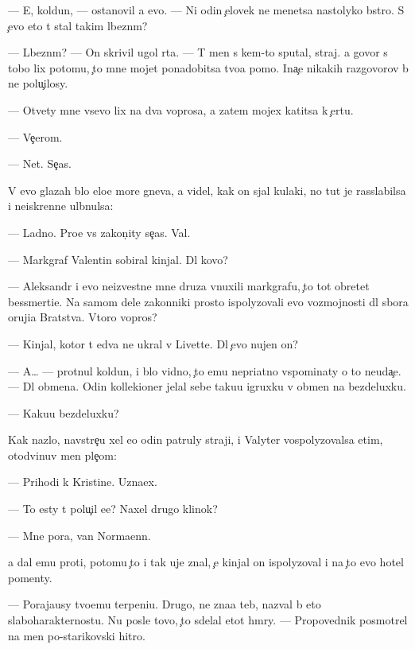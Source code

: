 \documentclass[10pt]{book}
\begin{document}
— E{\y}, koldun, — ostanovil {\y}a {\y}evo. — Ni odin {\c}elovek ne men{\ia}{\y}etsa nastolyko b{\yi}stro. S {\c}evo eto t{\yi} stal takim l{\iu}bezn{\yi}m?

— L{\iu}bezn{\yi}m? — On skrivil ugol rta. — T{\yi} men{\ia} s kem-to sputal, straj. {\Y}a govor{\iu} s tobo{\y} lix potomu, {\c}to mne mojet ponadobitsa tvo{\y}a pomo{\x}. Ina{\c}e nikakih razgovorov b{\yi} ne polu{\c}ilosy.

— Otvety mne vsevo lix na dva voprosa, a zatem mojex katitsa k {\c}ertu.

— Ve{\c}erom.

— Net. Se{\y}{\c}as.

V {\y}evo glazah b{\yi}lo {\q}elo{\y}e more gneva, {\y}a videl, kak on sjal kulaki, no tut je rasslabilsa i ne{\y}iskrenne ul{\yi}bnulsa:

— Ladno. Pro{\x}e vs{\e} zakon{\c}ity se{\y}{\c}as. Val{\ia}{\y}.

— Markgraf Valentin sobiral kinjal{\yi}. Dl{\ia} kovo?

— Aleksandr i {\y}evo ne{\y}izvestn{\yi}{\y}e mne druz{\y}a vnuxili markgrafu, {\c}to tot obretet bessmerti{\y}e. Na samom dele zakonniki prosto ispolyzovali {\y}evo vozmojnosti dl{\ia} sbora oruji{\y}a Bratstva. Vtoro{\y} vopros?

— Kinjal, kotor{\yi}{\y} t{\yi} {\y}edva ne ukral v Livette. Dl{\ia} {\c}evo nujen on?

— A… — prot{\ia}nul koldun, i b{\yi}lo vidno, {\c}to {\y}emu nepri{\y}atno vspominaty o to{\y} neuda{\c}e. — Dl{\ia} obmena. Odin kollek{\q}ioner jelal sebe taku{\y}u igruxku v obmen na bezdeluxku.

— Kaku{\y}u bezdeluxku?

Kak nazlo, navstre{\c}u xel {\y}e{\x}o odin patruly straji, i Valyter vospolyzovalsa etim, otodvinuv men{\ia} ple{\c}om:

— Prihodi k Kristine. Uzna{\y}ex.

— To {\y}esty t{\yi} polu{\c}il {\y}e{\y}e? Naxel drugo{\y} klinok?

— Mne pora, van Norma{\y}enn.

{\Y}a dal {\y}emu pro{\y}ti, potomu {\c}to i tak uje znal, {\c}e{\y} kinjal on ispolyzoval i na {\c}to {\y}evo hotel pomen{\ia}ty.



— Poraja{\y}usy tvo{\y}emu terpeni{\y}u. Drugo{\y}, ne zna{\y}a teb{\ia}, nazval b{\yi} eto slaboharakternost{\y}u. Nu posle tovo, {\c}to sdelal etot hm{\yi}ry. — Propovednik posmotrel na men{\ia} po-starikovski hitro.
\end{document}
